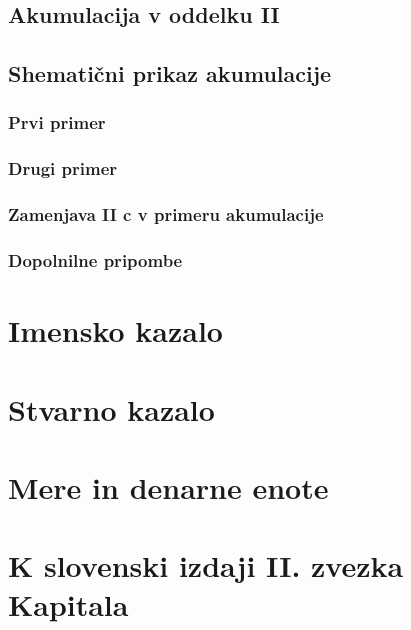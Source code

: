 \documentclass[a5paper]{scrbook}
\begin{document}
\section{Akumulacija v oddelku II}

\section{Shematični prikaz akumulacije}

\subsection{Prvi primer}

\subsection{Drugi primer}

\subsection{Zamenjava II c v primeru akumulacije}

\subsection{Dopolnilne pripombe}

\chapter{Imensko kazalo}

\chapter{Stvarno kazalo}

\chapter{Mere in denarne enote}

\chapter{K slovenski izdaji II. zvezka Kapitala}
\end{document}
